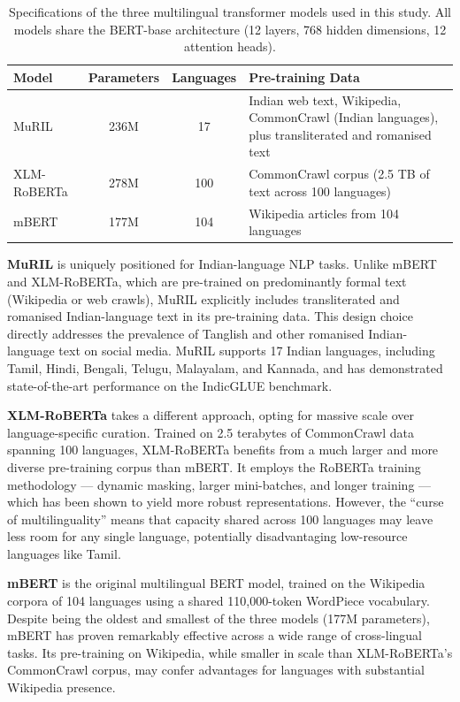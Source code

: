 \documentclass[12pt, a4paper]{article}
\begin{document}
\begin{table}[!htbp]
\centering
\caption{Specifications of the three multilingual transformer models used in this study. All models share the BERT-base architecture (12 layers, 768 hidden dimensions, 12 attention heads).}
\label{tab:model_specs}
\begin{tabular}{l c c p{5.5cm}}
\toprule
\textbf{Model} & \textbf{Parameters} & \textbf{Languages} & \textbf{Pre-training Data} \\
\midrule
MuRIL         & 236M & 17  & Indian web text, Wikipedia, CommonCrawl (Indian languages), plus transliterated and romanised text \\[0.5em]
XLM-RoBERTa   & 278M & 100 & CommonCrawl corpus (2.5 TB of text across 100 languages) \\[0.5em]
mBERT         & 177M & 104 & Wikipedia articles from 104 languages \\
\bottomrule
\end{tabular}
\end{table}

\vspace{1em}

\textbf{MuRIL} \citep{khanuja2021muril} is uniquely positioned for Indian-language NLP tasks. Unlike mBERT and XLM-RoBERTa, which are pre-trained on predominantly formal text (Wikipedia or web crawls), MuRIL explicitly includes transliterated and romanised Indian-language text in its pre-training data. This design choice directly addresses the prevalence of Tanglish and other romanised Indian-language text on social media. MuRIL supports 17 Indian languages, including Tamil, Hindi, Bengali, Telugu, Malayalam, and Kannada, and has demonstrated state-of-the-art performance on the IndicGLUE benchmark.

\textbf{XLM-RoBERTa} \citep{conneau2020xlmr} takes a different approach, opting for massive scale over language-specific curation. Trained on 2.5 terabytes of CommonCrawl data spanning 100 languages, XLM-RoBERTa benefits from a much larger and more diverse pre-training corpus than mBERT. It employs the RoBERTa training methodology --- dynamic masking, larger mini-batches, and longer training --- which has been shown to yield more robust representations. However, the ``curse of multilinguality'' \citep{conneau2020xlmr} means that capacity shared across 100 languages may leave less room for any single language, potentially disadvantaging low-resource languages like Tamil.

\textbf{mBERT} \citep{devlin2019bert} is the original multilingual BERT model, trained on the Wikipedia corpora of 104 languages using a shared 110,000-token WordPiece vocabulary. Despite being the oldest and smallest of the three models (177M parameters), mBERT has proven remarkably effective across a wide range of cross-lingual tasks. Its pre-training on Wikipedia, while smaller in scale than XLM-RoBERTa's CommonCrawl corpus, may confer advantages for languages with substantial Wikipedia presence.
\end{document}
